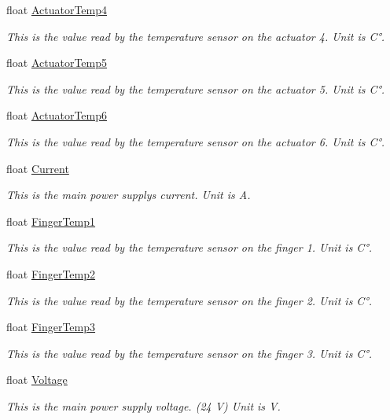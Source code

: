 \begin{DoxyCompactItemize}
float \hyperlink{structSensorsInfo_a69bb9fe27b7e18a1c09da9135a13c324}{Actuator\+Temp4}
\begin{DoxyCompactList}\small\item\em This is the value read by the temperature sensor on the actuator 4. Unit is C°. \end{DoxyCompactList}\item 
float \hyperlink{structSensorsInfo_a03c089c08df66cc62b0aa768557e2128}{Actuator\+Temp5}
\begin{DoxyCompactList}\small\item\em This is the value read by the temperature sensor on the actuator 5. Unit is C°. \end{DoxyCompactList}\item 
float \hyperlink{structSensorsInfo_aa22bb78967dc3b480280c422613f8382}{Actuator\+Temp6}
\begin{DoxyCompactList}\small\item\em This is the value read by the temperature sensor on the actuator 6. Unit is C°. \end{DoxyCompactList}\item 
float \hyperlink{structSensorsInfo_a2be7e431dce5a2093e6f61a7333b574c}{Current}
\begin{DoxyCompactList}\small\item\em This is the main power supply\textquotesingle{}s current. Unit is A. \end{DoxyCompactList}\item 
float \hyperlink{structSensorsInfo_a752833e7fba2c791ecf2693b96cff3d0}{Finger\+Temp1}
\begin{DoxyCompactList}\small\item\em This is the value read by the temperature sensor on the finger 1. Unit is C°. \end{DoxyCompactList}\item 
float \hyperlink{structSensorsInfo_a97f570d85f99948f785551712da25145}{Finger\+Temp2}
\begin{DoxyCompactList}\small\item\em This is the value read by the temperature sensor on the finger 2. Unit is C°. \end{DoxyCompactList}\item 
float \hyperlink{structSensorsInfo_ad18fa2c352189db0a8aff1d38c1c7b52}{Finger\+Temp3}
\begin{DoxyCompactList}\small\item\em This is the value read by the temperature sensor on the finger 3. Unit is C°. \end{DoxyCompactList}\item 
float \hyperlink{structSensorsInfo_a9ced23ff499026d028b2179945091775}{Voltage}
\begin{DoxyCompactList}\small\item\em This is the main power supply voltage. (24 V) Unit is V. \end{DoxyCompactList}\end{DoxyCompactItemize}


